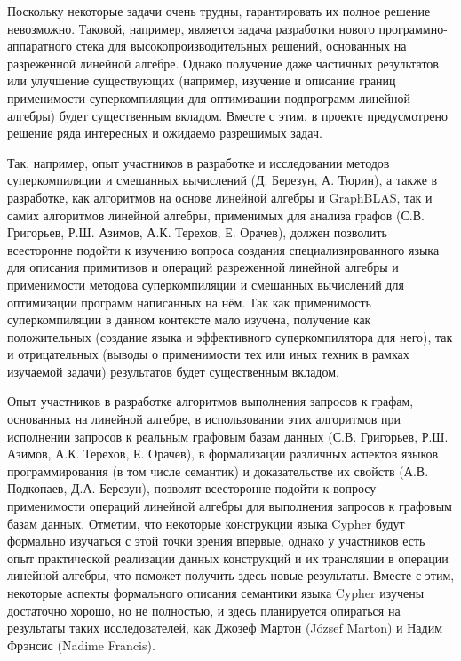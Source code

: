 \documentclass[12pt]{article}  %
\theoremstyle{remark}
\begin{document}
Поскольку некоторые задачи очень трудны, гарантировать их полное решение невозможно. Таковой, например, является задача разработки нового программно-аппаратного стека для высокопроизводительных решений, основанных на разреженной линейной алгебре. Однако получение даже частичных результатов или улучшение существующих (например, изучение и описание границ применимости суперкомпиляции для оптимизации подпрограмм линейной алгебры) будет существенным вкладом. Вместе с этим, в проекте предусмотрено решение ряда интересных и ожидаемо разрешимых задач.

Так, например, опыт участников в разработке и исследовании методов суперкомпиляции и смешанных вычислений (Д. Березун, А. Тюрин), а также в разработке, как алгоритмов на основе линейной алгебры и GraphBLAS, так и самих алгоритмов линейной алгебры, применимых для анализа графов (С.В. Григорьев, Р.Ш. Азимов, А.К. Терехов, Е. Орачев), должен позволить всесторонне подойти к изучению вопроса создания специализированного языка для описания примитивов и операций разреженной линейной алгебры и применимости методова суперкомпиляции и смешанных вычислений для оптимизации программ написанных на нём. Так как применимость суперкомпиляции в данном контексте мало изучена, получение как положительных (создание языка и эффективного суперкомпилятора для него), так и отрицательных (выводы о применимости тех или иных техник  в рамках изучаемой задачи) результатов будет существенным вкладом.

Опыт участников в разработке алгоритмов выполнения запросов к графам, основанных на линейной алгебре, в использовании этих алгоритмов при исполнении запросов к реальным графовым базам данных (С.В. Григорьев, Р.Ш. Азимов, А.К. Терехов, Е. Орачев), в формализации различных аспектов языков программирования (в том числе семантик) и доказательстве их свойств (А.В. Подкопаев, Д.А. Березун), позволят всесторонне подойти к вопросу применимости операций линейной алгебры для выполнения запросов к графовым базам данных. Отметим, что некоторые конструкции языка Cypher будут формально изучаться с этой точки зрения впервые, однако у участников есть опыт практической реализации данных конструкций и их трансляции в операции линейной алгебры, что поможет получить здесь новые результаты. Вместе с этим, некоторые аспекты формального описания семантики языка Cypher изучены достаточно хорошо, но не полностью, и здесь планируется опираться на результаты таких исследователей, как Джозеф Мартон (József Marton) и Надим Фрэнсис (Nadime Francis).
\end{document}

